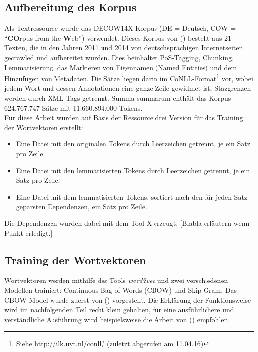   \subsection{Aufbereitung des Korpus}

  Als Textressource wurde das DECOW14X-Korpus (DE = Deutsch, COW = ``\textbf{CO}rpus from the \textbf{W}eb'') verwendet.
  Dieses Korpus von (\cite{schafer2012building})  besteht aus 21 Texten,
  die in den Jahren 2011 und 2014 von deutschsprachigen Internetseiten gecrawled und aufbereitet wurden. Dies beinhaltet
  PoS-Tagging, Chunking, Lemmatisierung, das Markieren von Eigennamen (Named Entities) und dem Hinzufügen von Metadaten.
  Die Sätze liegen darin im CoNLL-Format\footnote{Siehe \url{http://ilk.uvt.nl/conll/} (zuletzt abgerufen am 11.04.16)} vor,
  wobei jedem Wort und dessen Annotationen eine ganze Zeile gewidmet ist,
  Stazgrenzen werden durch XML-Tags getrennt. Summa summarum enthält das Korpus 624.767.747 Sätze mit 11.660.894.000 Tokens.\\

  Für diese Arbeit wurden auf Basis der Ressource drei Version für das Training der Wortvektoren erstellt:
  \begin{itemize}
      \item Eine Datei mit den originalen Tokens durch Leerzeichen getrennt, je ein Satz pro Zeile.
      \item Eine Datei mit den lemmatisierten Tokens durch Leerzeichen getrennt, je ein Satz pro Zeile.
      \item Eine Datei mit dem lemmatisierten Tokens, sortiert nach den für jeden Satz geparsten Dependenzen, ein Satz pro Zeile.
  \end{itemize}
  Die Dependenzen wurden dabei mit dem Tool X erzeugt. [Blabla erläutern wenn Punkt erledigt.]


  \subsection{Training der Wortvektoren}

  Wortvektoren werden mithilfe des Tools \emph{word2vec} und zwei verschiedenen Modellen trainiert: Continuous-Bag-of-Words (CBOW)
  und Skip-Gram. Das CBOW-Model wurde zuerst von (\cite{mikolov2013efficient}) vorgestellt. Die Erklärung der Funktionsweise
  wird im nachfolgenden Teil recht klein gehalten, für eine ausführlichere und verständliche Ausführung wird beispielsweise
  die Arbeit von (\cite{rong2014word2vec}) empfohlen.\\

